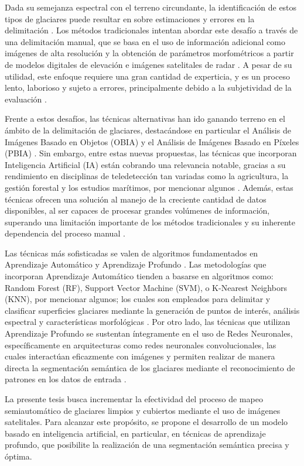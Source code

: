 Dada su semejanza espectral con el terreno circundante, la identificación de estos tipos de glaciares puede resultar en sobre estimaciones y errores en la delimitación \cite{nijhawan2018hybrid}. Los métodos tradicionales intentan abordar este desafío a través de una delimitación manual, que se basa en el uso de información adicional como imágenes de alta resolución y la obtención de parámetros morfométricos a partir de modelos digitales de elevación e imágenes satelitales de radar \cite{fang2017discriminative, lu2020glacier}. A pesar de su utilidad, este enfoque requiere una gran cantidad de experticia, y es un proceso lento, laborioso y sujeto a errores, principalmente debido a la subjetividad de la evaluación \cite{yan2021glacier, zhang2021automated, xie2022progressive, hu2022new}.

Frente a estos desafíos, las técnicas alternativas han ido ganando terreno en el ámbito de la delimitación de glaciares, destacándose en particular el Análisis de Imágenes Basado en Objetos (OBIA) y el Análisis de Imágenes Basado en Píxeles (PBIA) \cite{muhammad2013comparison, rastner2013comparison}. Sin embargo, entre estas nuevas propuestas, las técnicas que incorporan Inteligencia Artificial (IA) están cobrando una relevancia notable, gracias a su rendimiento en disciplinas de teledetección tan variadas como la agricultura, la gestión forestal y los estudios marítimos, por mencionar algunos \cite{hoeser2020object2}. Además, estas técnicas ofrecen una solución al manejo de la creciente cantidad de datos disponibles, al ser capaces de procesar grandes volúmenes de información, superando una limitación importante de los métodos tradicionales y su inherente dependencia del proceso manual \cite{lu2020glacier}.

Las técnicas más sofisticadas se valen de algoritmos fundamentados en Aprendizaje Automático y Aprendizaje Profundo \cite{xie2021evaluating}. Las metodologías que incorporan Aprendizaje Automático tienden a basarse en algoritmos como: Random Forest (RF), Support Vector Machine (SVM), o K-Nearest Neighbors (KNN), por mencionar algunos; los cuales son empleados para delimitar y clasificar superficies glaciares mediante la generación de puntos de interés, análisis espectral y características morfológicas \cite{alifu2020machine, haq2021snow}. Por otro lado, las técnicas que utilizan Aprendizaje Profundo se sustentan íntegramente en el uso de Redes Neuronales, específicamente en arquitecturas como redes neuronales convolucionales, las cuales interactúan eficazmente con imágenes y permiten realizar de manera directa la segmentación semántica de los glaciares mediante el reconocimiento de patrones en los datos de entrada \cite{khan2022deep}.

La presente tesis busca incrementar la efectividad del proceso de mapeo semiautomático de glaciares limpios y cubiertos mediante el uso de imágenes satelitales. Para alcanzar este propósito, se propone el desarrollo de un modelo basado en inteligencia artificial, en particular, en técnicas de aprendizaje profundo, que posibilite la realización de una segmentación semántica precisa y óptima.